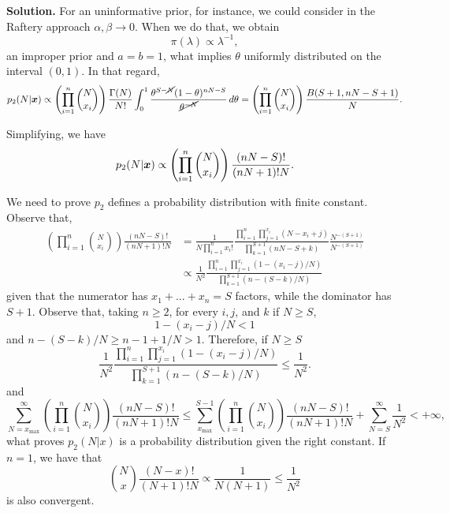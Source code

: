 \vspace{2ex}

    {\bf Solution.} For an uninformative prior, for instance, we could
    consider in the Raftery approach $\alpha, \beta \to 0$. When we do that,
    we obtain 
    $$
    \pi(\lambda) \propto \lambda^{-1},
    $$
    an improper prior and $a = b = 1$,  what implies $\theta$ uniformly
    distributed on the interval $(0,1)$. In that regard, 
    \begin{equation*}
        p_2(N|\boldsymbol{x}) \propto \left(\prod_{i=1}^n \binom{N}{x_i}\right)\frac{\Gamma(N)}{N!} \int_0^1 \frac{\theta^{S-\cancel{N}}(1-\theta)^{nN-S}}{\cancel{\theta^{-N}}} \, d\theta = \left(\prod_{i=1}^n \binom{N}{x_i}\right)\frac{B(S+1,nN-S+1)}{N} .
    \end{equation*}

    Simplifying, we have 
    \begin{equation}
        \label{eq:p2-posterior}
        p_2(N|\boldsymbol{x}) \propto \left(\prod_{i=1}^n \binom{N}{x_i}\right)\frac{(nN-S)!}{(nN+1)!N}.
    \end{equation}
 
    We need to prove $p_2$ defines a probability distribution with finite
    constant. 
    Observe that, 
    \begin{equation*}
        \begin{split}
        \left(\prod_{i=1}^n \binom{N}{x_i}\right)\frac{(nN-S)!}{(nN+1)!N} &= \frac{1}{N\prod_{i=1}^n x_i!}\frac{\prod_{i=1}^n\prod_{j=1}^{x_i} (N - x_i + j)}{\prod_{k=1}^{S+1}(nN - S + k)}\frac{N^{-(S+1)}}{N^{-(S+1)}}  \\
        &\propto \frac{1}{N^2}\frac{\prod_{i=1}^n\prod_{j=1}^{x_i} (1 - (x_i - j)/N)}{\prod_{k=1}^{S+1}(n - (S - k)/N)} 
        \end{split}
    \end{equation*}
    given that the numerator has $x_1 + ... + x_n = S$ factors, while the dominator has $S+1$. Observe that, taking $n \ge 2$, for every $i, j$, and $k$ if $N
    \ge S$, 
    $$
    1 - (x_i - j)/N < 1
    $$
    and $n - (S - k)/N \ge n - 1 + 1/N > 1$. Therefore, if $N \ge S$
    $$
    \frac{1}{N^2}\frac{\prod_{i=1}^n\prod_{j=1}^{x_i} (1 - (x_i - j)/N)}{\prod_{k=1}^{S+1}(n - (S - k)/N)} \le \frac{1}{N^2}.
    $$
    and 
    $$
    \sum_{N=x_{\max}}^{\infty} \left(\prod_{i=1}^n \binom{N}{x_i}\right)\frac{(nN-S)!}{(nN+1)!N} \le \sum_{x_{\max}}^{S-1} \left(\prod_{i=1}^n \binom{N}{x_i}\right)\frac{(nN-S)!}{(nN+1)!N} + \sum_{N=S}^{\infty} \frac{1}{N^2} < +\infty,
    $$
    what proves $p_2(N|x)$ is a probability distribution given the right
    constant. If $n=1$, we have that 
    $$
    \binom{N}{x}\frac{(N-x)!}{(N+1)!N} \propto \frac{1}{N(N+1)} \le \frac{1}{N^2}
    $$
    is also convergent.